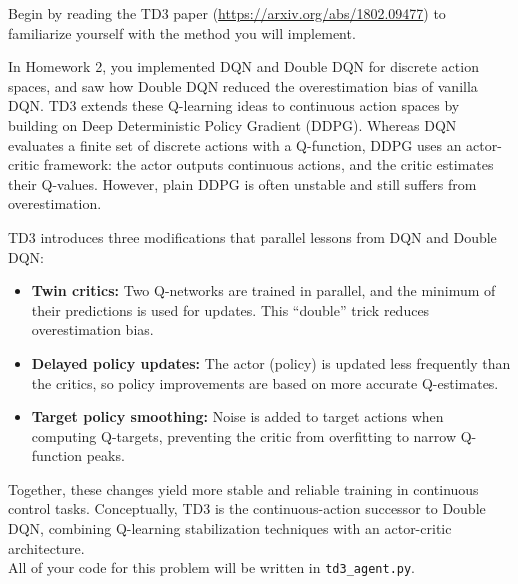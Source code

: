 \documentclass[12pt]{article}
\begin{document}
Begin by reading the TD3 paper (\url{https://arxiv.org/abs/1802.09477}) to familiarize yourself with the method you will implement.

In Homework 2, you implemented DQN and Double DQN for discrete action spaces, and saw how Double DQN reduced the overestimation bias of vanilla DQN. TD3 extends these Q-learning ideas to continuous action spaces by building on Deep Deterministic Policy Gradient (DDPG). Whereas DQN evaluates a finite set of discrete actions with a Q-function, DDPG uses an actor-critic framework: the actor outputs continuous actions, and the critic estimates their Q-values. However, plain DDPG is often unstable and still suffers from overestimation.

TD3 introduces three modifications that parallel lessons from DQN and Double DQN:
\begin{itemize}
    \item \textbf{Twin critics:} Two Q-networks are trained in parallel, and the minimum of their predictions is used for updates. This “double” trick reduces overestimation bias.
    \item \textbf{Delayed policy updates:} The actor (policy) is updated less frequently than the critics, so policy improvements are based on more accurate Q-estimates.
    \item \textbf{Target policy smoothing:} Noise is added to target actions when computing Q-targets, preventing the critic from overfitting to narrow Q-function peaks.
\end{itemize}

Together, these changes yield more stable and reliable training in continuous control tasks. Conceptually, TD3 is the continuous-action successor to Double DQN, combining Q-learning stabilization techniques with an actor-critic architecture. \\
\noindent
All of your code for this problem will be written in \texttt{td3\_agent.py}.
\end{document}
